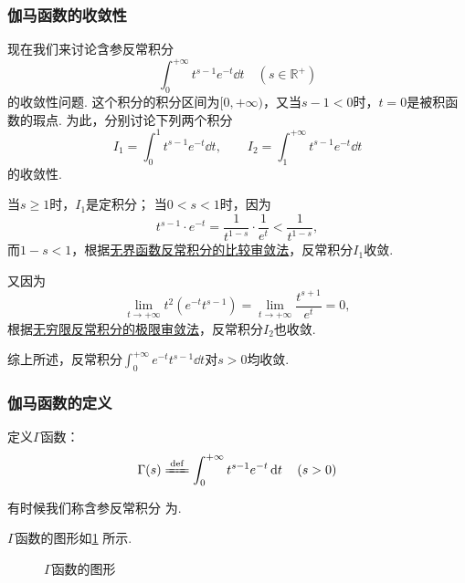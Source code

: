\subsubsection{伽马函数的收敛性}
现在我们来讨论含参反常积分\[
\int_0^{+\infty} t^{s-1} e^{-t} \dd{t} \quad(s\in\mathbb{R}^+)
\]的收敛性问题.
这个积分的积分区间为\([0,+\infty)\)，又当\(s-1<0\)时，\(t=0\)是被积函数的瑕点.
为此，分别讨论下列两个积分\[
I_1 = \int_0^1 t^{s-1} e^{-t} \dd{t},
\qquad
I_2 = \int_1^{+\infty} t^{s-1} e^{-t} \dd{t}
\]的收敛性.

当\(s \geq 1\)时，\(I_1\)是定积分；
当\(0 < s < 1\)时，因为\[
t^{s-1} \cdot e^{-t} = \frac{1}{t^{1-s}} \cdot \frac{1}{e^t} < \frac{1}{t^{1-s}},
\]而\(1-s < 1\)，根据\hyperref[theorem:定积分.无界函数的反常积分的比较审敛法]{无界函数反常积分的比较审敛法}，反常积分\(I_1\)收敛.

又因为\[
\lim\limits_{t\to+\infty} t^2 (e^{-t} t^{s-1})
= \lim\limits_{t\to+\infty} \frac{t^{s+1}}{e^t} = 0,
\]根据\hyperref[theorem:定积分.无穷限反常积分的极限审敛法]{无穷限反常积分的极限审敛法}，反常积分\(I_2\)也收敛.

综上所述，反常积分\(\int_0^{+\infty} e^{-t} t^{s-1} \dd{t}\)对\(s > 0\)均收敛.

\subsubsection{伽马函数的定义}
\begin{definition}
定义\(\Gamma\)函数：
\begin{equation}\label{equation:特殊函数.伽马函数的积分定义}
\Gamma(s)
\defeq
\int_0^{+\infty} t^{s-1} e^{-t} \dd{t}
\quad(s>0)
\end{equation}
\end{definition}
有时候我们称含参反常积分  为.

\(\Gamma\)函数的图形如\cref{figure:定积分.伽马函数} 所示.

\begin{figure}%
\centering
{}
\caption{\(\Gamma\)函数的图形}
\label{figure:定积分.伽马函数}
\end{figure}

